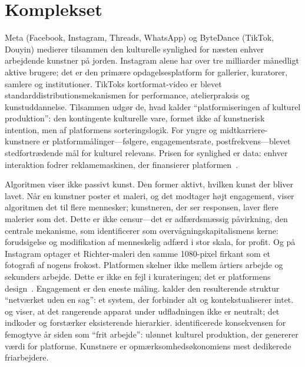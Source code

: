 \documentclass[10pt,letterpaper,twocolumn]{article}
\begin{document}
\section{Komplekset}

Meta (Facebook, Instagram, Threads, WhatsApp) og ByteDance (TikTok, Douyin) medierer tilsammen den kulturelle synlighed for næsten enhver arbejdende kunstner på jorden. Instagram alene har over tre milliarder månedligt aktive brugere; det er den primære opdagelsesplatform for gallerier, kuratorer, samlere og institutioner. TikToks kortformat-video er blevet standarddistributionsmekanismen for performance, atelierpraksis og kunstuddannelse. Tilsammen udgør de, hvad \citet{nieborg2018platformization} kalder ``platformiseringen af kulturel produktion'': den kontingente kulturelle vare, formet ikke af kunstnerisk intention, men af platformens sorteringslogik. For yngre og midtkarriere-kunstnere er platformmålinger---følgere, engagementsrate, postfrekvens---blevet stedfortrædende mål for kulturel relevans. Prisen for synlighed er data: enhver interaktion fodrer reklamemaskinen, der finansierer platformen~\citep{zuboff2019surveillance, srnicek2017platform}.

Algoritmen viser ikke passivt kunst. Den former aktivt, hvilken kunst der bliver lavet. Når en kunstner poster et maleri, og det modtager højt engagement, viser algoritmen det til flere mennesker; kunstneren, der ser responsen, laver flere malerier som det. Dette er ikke censur---det er adfærdsmæssig påvirkning, den centrale mekanisme, som \citet{zuboff2019surveillance} identificerer som overvågningskapitalismens kerne: forudsigelse og modifikation af menneskelig adfærd i stor skala, for profit. Og på Instagram optager et Richter-maleri den samme 1080-pixel firkant som et fotografi af nogens frokost. Platformen skelner ikke mellem årtiers arbejde og sekunders arbejde. Dette er ikke en fejl i kurateringen; det er platformens design~\citep{chun2016updating}. Engagement er den eneste måling. \citet{lovink2011networks} kalder den resulterende struktur ``netværket uden en sag'': et system, der forbinder alt og kontekstualiserer intet. \citet{noble2018algorithms} og \citet{benjamin2019race} viser, at det rangerende apparat under udfladningen ikke er neutralt; det indkoder og forstærker eksisterende hierarkier. \citet{terranova2000free} identificerede konsekvensen for femogtyve år siden som ``frit arbejde'': ulønnet kulturel produktion, der genererer værdi for platforme. Kunstnere er opmærksomhedsøkonomiens mest dedikerede friarbejdere.
\end{document}
